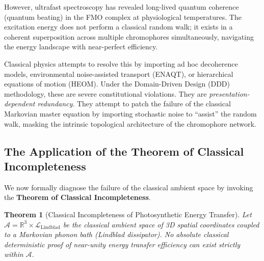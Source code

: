 \documentclass[11pt,openany]{extbook}
\theoremstyle{plain}
\newtheorem{theorem}{Theorem}[chapter]
\theoremstyle{definition}
\begin{document}
However, ultrafast spectroscopy has revealed long-lived quantum coherence (quantum beating) in the FMO complex at physiological temperatures. The excitation energy does not perform a classical random walk; it exists in a coherent superposition across multiple chromophores simultaneously, navigating the energy landscape with near-perfect efficiency.

Classical physics attempts to resolve this by importing ad hoc decoherence models, environmental noise-assisted transport (ENAQT), or hierarchical equations of motion (HEOM). Under the Domain-Driven Design (DDD) methodology, these are severe constitutional violations. They are \textit{presentation-dependent redundancy}. They attempt to patch the failure of the classical Markovian master equation by importing stochastic noise to ``assist'' the random walk, masking the intrinsic topological architecture of the chromophore network.

\subsection{The Application of the Theorem of Classical Incompleteness}
We now formally diagnose the failure of the classical ambient space by invoking the \textbf{Theorem of Classical Incompleteness}.

\begin{theorem}[Classical Incompleteness of Photosynthetic Energy Transfer]
Let $\mathcal{A} = \mathbb{R}^3 \times \mathcal{L}_{\text{Lindblad}}$ be the classical ambient space of 3D spatial coordinates coupled to a Markovian phonon bath (Lindblad dissipator). No absolute classical deterministic proof of near-unity energy transfer efficiency can exist strictly within $\mathcal{A}$.
\end{theorem}
\end{document}
